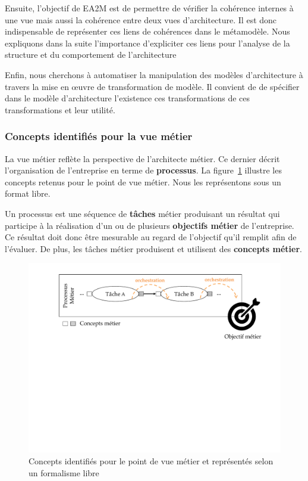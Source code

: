     Ensuite, l’objectif de EA2M est de permettre de vérifier la cohérence internes à une vue mais
    aussi la cohérence entre deux vues d'architecture. Il est donc indispensable de représenter
    ces liens de cohérences dans le métamodèle. Nous expliquons dans la suite l'importance
    d'expliciter ces liens pour l'analyse de la structure et du comportement de l'architecture

    Enfin, nous cherchons à automatiser la manipulation des modèles d'architecture à travers
    la mise en œuvre de transformation de modèle. Il convient de de spécifier dans le modèle
    d'architecture l’existence ces transformations de ces transformations et leur utilité.



    \subsubsection{Concepts identifiés pour la vue métier}

    La vue métier reflète la perspective de l'architecte métier. Ce dernier
    décrit l’organisation de l'entreprise en terme de \textbf{processus}. 
    La figure~\ref{fig:concepts_vue_metier} illustre les concepts retenus pour le point de vue
    métier. Nous les représentons sous un format libre.

    Un processus est une séquence
    de \textbf{tâches} métier produisant un résultat qui
    participe à la réalisation d'un ou de plusieurs \textbf{objectifs métier} de l'entreprise.
    Ce résultat doit donc être mesurable au regard de l'objectif qu'il remplit afin de l'évaluer.
    De plus, les tâches métier produisent et utilisent des \textbf{concepts métier}.


    \begin{figure}[!ht]
     \begin{center}
     \includegraphics[trim= 0cm 11cm 0cm 0cm, width=1\textwidth]{figures/4_demarche/concepts_vue_metier.pdf} \end{center}
     \caption{Concepts identifiés pour le point de vue métier et représentés selon un formalisme libre}
     \label{fig:concepts_vue_metier}
    \end{figure}

